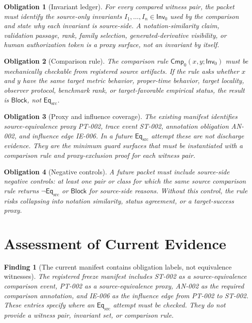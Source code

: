 \documentclass[11pt]{article}
\newcommand{\Inv}{\mathsf{Inv}_{0}}
\newcommand{\Cmp}{\mathsf{Cmp}_{0}}
\newcommand{\EqSrc}{\mathsf{Eq}_{\mathrm{src}}}
\newcommand{\Block}{\mathsf{Block}}
\newtheorem{obligation}{Obligation}
\newtheorem{finding}{Finding}
\begin{document}
\begin{obligation}[Invariant ledger]
For every compared witness pair, the packet must identify the source-only
invariants \(I_{1},\dots,I_{n} \in \Inv\) used by the comparison and state
why each invariant is source-side. A notation-similarity claim, validation
passage, rank, family selection, generated-derivative visibility, or human
authorization token is a proxy surface, not an invariant by itself.
\end{obligation}

\begin{obligation}[Comparison rule]
The comparison rule \(\Cmp(x,y;\Inv)\) must be mechanically checkable from
registered source artifacts. If the rule asks whether \(x\) and \(y\) have
the same target metric behavior, proper-time behavior, target locality,
observer protocol, benchmark rank, or target-favorable empirical status,
the result is \(\Block\), not \(\EqSrc\).
\end{obligation}

\begin{obligation}[Proxy and influence coverage]
The existing manifest identifies source-equivalence proxy PT-002, trace
event ST-002, annotation obligation AN-002, and influence edge IE-006. In a
future \(\EqSrc\) attempt these are not discharge evidence. They are the
minimum guard surfaces that must be instantiated with a comparison rule and
proxy-exclusion proof for each witness pair.
\end{obligation}

\begin{obligation}[Negative controls]
A future packet must include source-side negative controls: at least one
pair or class for which the same source comparison rule returns
\(\neg\EqSrc\) or \(\Block\) for source-side reasons. Without this control,
the rule risks collapsing into notation similarity, status agreement, or a
target-success proxy.
\end{obligation}

\section{Assessment of Current Evidence}

\begin{finding}[The current manifest contains obligation labels, not
equivalence witnesses]
The registered freeze manifest includes ST-002 as a source-equivalence
comparison event, PT-002 as a source-equivalence proxy, AN-002 as the
required comparison annotation, and IE-006 as the influence edge from PT-002
to ST-002. These entries specify where an \(\EqSrc\) attempt must be
checked. They do not provide a witness pair, invariant set, or comparison
rule.
\end{finding}
\end{document}
